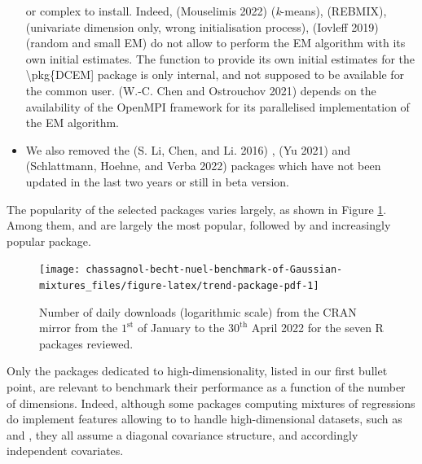 \begin{itemize}
  or complex to install. Indeed,  (Mouselimis 2022)
  (\emph{k}-means),  (REBMIX),  (univariate
  dimension only, wrong initialisation process), 
  (Iovleff 2019) (random and small EM) do not allow to perform the EM
  algorithm with its own initial estimates. The function to provide its own initial estimates for the \textbackslash pkg\{DCEM{]} package is only internal, and not supposed to be available for the common user.  (W.-C. Chen and Ostrouchov 2021) depends on
  the availability of the OpenMPI framework for its parallelised
  implementation of the EM algorithm.
\item
  We also removed the  (S. Li, Chen, and Li. 2016) ,
   (Yu 2021) and  (Schlattmann, Hoehne, and Verba 2022) packages
  which have not been updated in the last two years or still in beta
  version.
\end{itemize}

The popularity of the selected packages varies largely, as shown in
Figure
\ref{fig:trend-package-pdf}.
Among them,  and  are largely the most popular,
followed by  and increasingly popular 
package.

\begin{figure}

{\centering \texttt{[image: chassagnol-becht-nuel-benchmark-of-Gaussian-mixtures\_files/figure-latex/trend-package-pdf-1]} 

}

\caption{Number of daily downloads (logarithmic scale) from the CRAN mirror from the $1^\text{st}$ of January to the $30^{\text{th}}$ April 2022 for the seven R packages reviewed.}\label{fig:trend-package-pdf}
\end{figure}

\color{blue}

Only the packages dedicated to high-dimensionality, listed in our first bullet point, are relevant to benchmark their performance as a function of the number of dimensions. Indeed, although some packages computing mixtures of regressions do implement features allowing to to handle high-dimensional datasets, such as  and , they all assume a diagonal covariance structure, and accordingly independent covariates.

